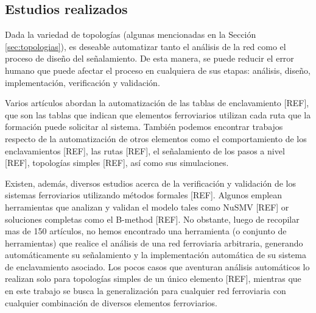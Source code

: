 \subsection{Estudios realizados}

    Dada la variedad de topologías (algunas mencionadas en la Sección \ref{sec:topologias}), es deseable automatizar tanto el análisis de la red como el proceso de diseño del señalamiento. De esta manera, se puede reducir el error humano que puede afectar el proceso en cualquiera de sus etapas: análisis, diseño, implementación, verificación y validación.

    Varios artículos abordan la automatización de las tablas de enclavamiento [REF], que son las tablas que indican que elementos ferroviarios utilizan cada ruta que la formación puede solicitar al sistema. También podemos encontrar trabajos respecto de la automatización de otros elementos como el comportamiento de los enclavamientos [REF], las rutas [REF], el señalamiento de los pasos a nivel [REF], topologías simples [REF], así como sus simulaciones.

    Existen, además, diversos estudios acerca de la verificación y validación de los sistemas ferroviarios utilizando métodos formales [REF]. Algunos emplean herramientas que analizan y validan el modelo tales como NuSMV [REF] or soluciones completas como el B-method [REF]. No obstante, luego de recopilar mas de 150 artículos, no hemos encontrado una herramienta (o conjunto de herramientas) que realice el análisis de una red ferroviaria arbitraria, generando automáticamente su señalamiento y la implementación automática de su sistema de enclavamiento asociado. Los pocos casos que aventuran análisis automáticos lo realizan solo para topologías simples de un único elemento [REF], mientras que en este trabajo se busca la generalización para cualquier red ferroviaria con cualquier combinación de diversos elementos ferroviarios.